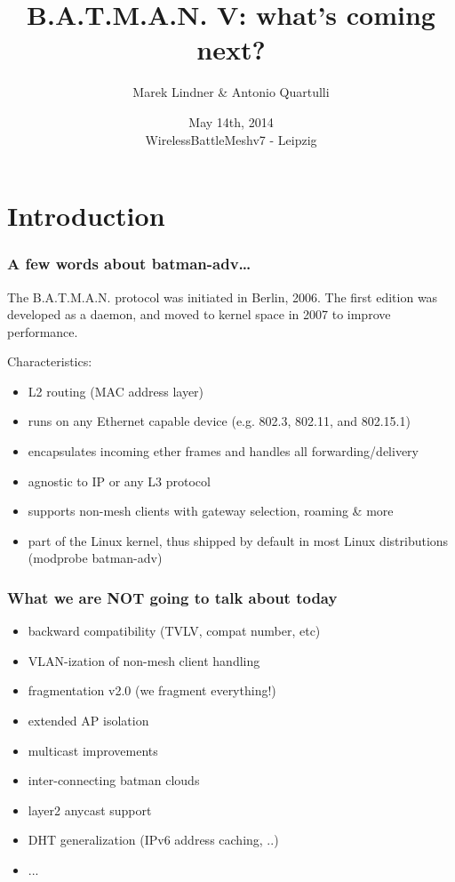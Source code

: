 \documentclass[slidestop]{beamer}
\title[B.A.T.M.A.N. V: what's coming next?]{B.A.T.M.A.N. V: what's coming next?}
\author{Marek Lindner \& Antonio Quartulli}
\date{May 14th, 2014\\WirelessBattleMeshv7 - Leipzig}
\institute[]{B.A.T.M.A.N.-Advanced\\www.open-mesh.org}
\begin{document}
\begin{frame}
	\titlepage
\end{frame}

\section{Introduction}
\begin{frame}[c]
	\frametitle{A few words about batman-adv\dots}

	The B.A.T.M.A.N. protocol was initiated in Berlin, 2006. The first edition was developed as a daemon, and moved to kernel space in 2007 to improve performance.

	Characteristics:
	\begin{itemize}
		\item L2 routing (MAC address layer)
		\item runs on any Ethernet capable device (e.g. 802.3, 802.11, and 802.15.1)
		\item encapsulates incoming ether frames and handles all forwarding/delivery
		\item agnostic to IP or any L3 protocol
		\item supports non-mesh clients with gateway selection, roaming \& more
		\item part of the Linux kernel, thus shipped by default in most Linux distributions (modprobe batman-adv)
	\end{itemize}
\end{frame}

\begin{frame}[c]
	\frametitle{What we are NOT going to talk about today}
	\begin{itemize}
		\item backward compatibility (TVLV, compat number, etc)
		\item VLAN-ization of non-mesh client handling
		\item fragmentation v2.0 (we fragment everything!)
		\item extended AP isolation
		\item multicast improvements
		\item inter-connecting batman clouds
		\item layer2 anycast support
		\item DHT generalization (IPv6 address caching, ..)
		\item ...
	\end{itemize}
\end{frame}
\end{document}
